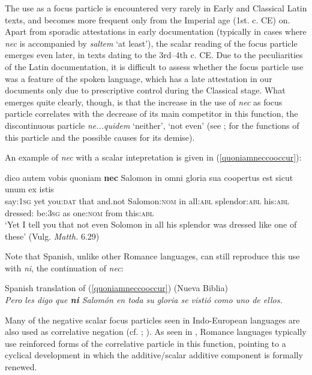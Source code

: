 \documentclass[output=paper]{langsci/langscibook}
\begin{document}
The use as a focus particle is encountered very rarely in Early and Classical Latin texts, and becomes more frequent only from the Imperial age (1st. c. CE) on. Apart from sporadic attestations in early documentation (typically in cases where {\emph{nec}} is accompanied by {\emph{saltem}} `at least'), the scalar reading of the focus particle emerges even later, in texts dating to the 3rd--4th c. CE. Due to the peculiarities of the Latin documentation, it is difficult to assess whether the focus particle use was a feature of the spoken language, which has a late attestation in our documents only due to prescriptive control during the Classical stage. What emerges quite clearly, though, is that the increase in the use of {\emph{nec}} as focus particle correlates with the decrease of its main competitor in this function, the discontinuous particle {\emph{ne...quidem}} `neither', `not even' (see \citealt[chapter 7]{Orlandini01}; \citealt[]{Gianollo17} for the functions of this particle and the possible causes for its demise).

An example of {\emph{nec}} with a scalar intepretation is given in (\ref{quoniamneccooccur}):

{\begin{exe}
\ex \label{quoniamneccooccur} \gll dico autem vobis quoniam {\textbf{nec}} Salomon in omni gloria sua coopertus est sicut unum ex istis\\
say:{\textsc{1sg}} yet you:{\textsc{dat}} that and.not Salomon:{\textsc{nom}} in all:{\textsc{abl}} splendor:{\textsc{abl}} his:{\textsc{abl}} dressed:{\textsc{\ptcp}} be:{\textsc{3sg}} as one:{\textsc{nom}} from this:{\textsc{abl}}\\
\glt `Yet I tell you that not even Solomon in all his splendor was dressed like one of these' (Vulg. {\emph{Matth.}} 6.29)
\end{exe}}

\noindent Note that Spanish, unlike other Romance languages, can still reproduce this use with {\emph{ni}}, the continuation of {\emph{nec}}:

\begin{exe}
\ex Spanish translation of (\ref{quoniamneccooccur}) (Nueva Biblia)\\
\itshape Pero les digo que {\textbf{ni}} Salom\'on en toda su gloria se visti\'o como uno de ellos.
\end{exe}

\noindent Many of the negative scalar focus particles seen in Indo-European languages are also used as correlative negation (cf. \citealt[chapter 4]{Koenig91}; \citealt[]{Haspelmath07}). As seen in , Romance languages typically use reinforced forms of the correlative particle in this function, pointing to a cyclical development in which the additive/scalar additive component is formally renewed.
\end{document}
